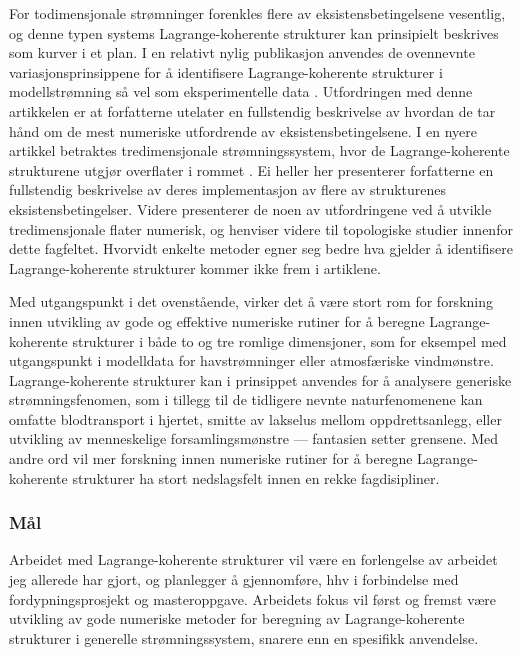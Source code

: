 For todimensjonale strømninger forenkles flere av eksistensbetingelsene
vesentlig, og denne typen systems Lagrange-koherente strukturer kan
prinsipielt beskrives som kurver i et plan. I en relativt nylig publikasjon
anvendes de ovennevnte variasjonsprinsippene for å identifisere
Lagrange-koherente strukturer i modellstrømning så vel som eksperimentelle data
\parencite{farazmand2012computing}. Utfordringen med denne artikkelen er at
forfatterne utelater en fullstendig beskrivelse av hvordan de tar hånd om
de mest numeriske utfordrende av eksistensbetingelsene. I en nyere artikkel
betraktes tredimensjonale strømningssystem, hvor de Lagrange-koherente
strukturene utgjør overflater i rommet \parencite{oettinger2016autonomous}.
Ei heller her presenterer forfatterne en fullstendig beskrivelse av deres
implementasjon av flere av strukturenes eksistensbetingelser. Videre presenterer
de noen av utfordringene ved å utvikle tredimensjonale flater numerisk, og
henviser videre til topologiske studier innenfor dette fagfeltet. Hvorvidt
enkelte metoder egner seg bedre hva gjelder å identifisere Lagrange-koherente
strukturer kommer ikke frem i artiklene.

Med utgangspunkt i det ovenstående, virker det å være stort rom for forskning
innen utvikling av gode og effektive numeriske rutiner for å beregne
Lagrange-koherente strukturer i både to og tre romlige dimensjoner, som for
eksempel med utgangspunkt i modelldata for havstrømninger eller atmosfæriske
vindmønstre. Lagrange-koherente strukturer kan i prinsippet anvendes for å
analysere generiske strømningsfenomen, som i tillegg til de tidligere nevnte
naturfenomenene kan omfatte blodtransport i hjertet, smitte av lakselus
mellom oppdrettsanlegg, eller utvikling av menneskelige forsamlingsmønstre ---
fantasien setter grensene. Med andre ord vil mer forskning innen numeriske
rutiner for å beregne Lagrange-koherente strukturer ha stort nedslagsfelt innen
en rekke fagdisipliner.

\subsubsection*{Mål}

Arbeidet med Lagrange-koherente strukturer vil være en forlengelse av
arbeidet jeg allerede har gjort, og planlegger å gjennomføre, hhv i forbindelse
med fordypningsprosjekt og masteroppgave. Arbeidets fokus vil først og fremst
være utvikling av gode numeriske metoder for beregning av Lagrange-koherente
strukturer i generelle strømningssystem, snarere enn en spesifikk anvendelse.


